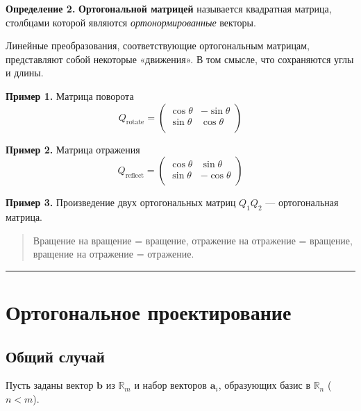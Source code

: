 \documentclass[11pt,a4paper]{article}
\begin{document}
\textbf{Определение 2.} \textbf{Ортогональной матрицей} называется
квадратная матрица, столбцами которой являются \emph{ортонормированные}
векторы.

Линейные преобразования, соответствующие ортогональным матрицам,
представляют собой некоторые «движения». В том смысле, что сохраняются
углы и длины.

\textbf{Пример 1.} Матрица поворота \[
  Q_\mathrm{rotate} = 
  \begin{pmatrix}
     \cos\theta & -\sin\theta \\
     \sin\theta &  \cos\theta \\
  \end{pmatrix}
\]

\textbf{Пример 2.} Матрица отражения \[
  Q_\mathrm{reflect} = 
  \begin{pmatrix}
     \cos\theta &  \sin\theta \\
     \sin\theta & -\cos\theta \\
  \end{pmatrix}
\]

\textbf{Пример 3.} Произведение двух ортогональных матриц \(Q_1 Q_2\)
--- ортогональная матрица.

\begin{quote}
Вращение на вращение = вращение, отражение на отражение = вращение,
вращение на отражение = отражение.
\end{quote}

    \begin{center}\rule{0.5\linewidth}{0.5pt}\end{center}

    \hypertarget{ux43eux440ux442ux43eux433ux43eux43dux430ux43bux44cux43dux43eux435-ux43fux440ux43eux435ux43aux442ux438ux440ux43eux432ux430ux43dux438ux435}{%
\section{Ортогональное
проектирование}\label{ux43eux440ux442ux43eux433ux43eux43dux430ux43bux44cux43dux43eux435-ux43fux440ux43eux435ux43aux442ux438ux440ux43eux432ux430ux43dux438ux435}}

\hypertarget{ux43eux431ux449ux438ux439-ux441ux43bux443ux447ux430ux439}{%
\subsection{Общий
случай}\label{ux43eux431ux449ux438ux439-ux441ux43bux443ux447ux430ux439}}

Пусть заданы вектор \(\mathbf{b}\) из \(\mathbb{R}_m\) и набор векторов
\(\mathbf{a}_i\), образующих базис в \(\mathbb{R}_n\) (\(n<m\)).
\end{document}

